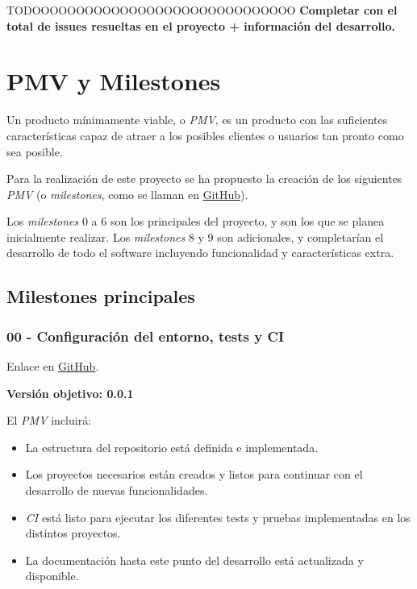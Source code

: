 TODOOOOOOOOOOOOOOOOOOOOOOOOOOOOOO
\textbf{Completar con el total de issues resueltas en el proyecto + información del desarrollo.}

\section{PMV y Milestones}

Un producto mínimamente viable, o \textit{PMV}, es un producto con las suficientes características capaz de atraer a los posibles clientes o usuarios tan pronto como sea posible.

Para la realización de este proyecto se ha propuesto la creación de los siguientes \textit{PMV} (o \textit{milestones}, como se llaman en \href{https://github.com/harvestcore/matroos/milestones}{GitHub}).

Los \textit{milestones} 0 a 6 son los principales del proyecto, y son los que se planea inicialmente realizar. Los \textit{milestones} 8 y 9 son adicionales, y completarían el desarrollo de todo el software incluyendo funcionalidad y características extra.

\subsection{Milestones principales}

\subsubsection{00 - Configuración del entorno, tests y CI}

Enlace en \href{https://github.com/harvestcore/matroos/milestone/3}{GitHub}.

\textbf{Versión objetivo: 0.0.1}

El \textit{PMV} incluirá:

\begin{itemize}
	\item La estructura del repositorio está definida e implementada.
	\item Los proyectos necesarios están creados y listos para continuar con el desarrollo de nuevas funcionalidades.
	\item \textit{CI} está listo para ejecutar los diferentes tests y pruebas implementadas en los distintos proyectos.
	\item La documentación hasta este punto del desarrollo está actualizada y disponible.
\end{itemize}

